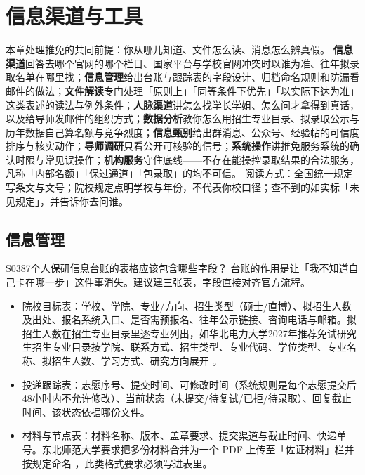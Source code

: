 \chapter{信息渠道与工具}
\label{ch21}
\begin{keybox}
本章处理推免的共同前提：你从哪儿知道、文件怎么读、消息怎么辨真假。
\textbf{信息渠道}回答去哪个官网的哪个栏目、国家平台与学校官网冲突时以谁为准、往年拟录取名单在哪里找；\textbf{信息管理}给出台账与跟踪表的字段设计、归档命名规则和防漏看邮件的做法；\textbf{文件解读}专门处理「原则上」「同等条件下优先」「以实际下达为准」这类表述的读法与例外条件；\textbf{人脉渠道}讲怎么找学长学姐、怎么问才拿得到真话，以及给导师发邮件的组织方式；\textbf{数据分析}教你怎么用招生专业目录、拟录取公示与历年数据自己算名额与竞争烈度；\textbf{信息甄别}给出群消息、公众号、经验帖的可信度排序与核实动作；\textbf{导师调研}只看公开可核验的信号；\textbf{系统操作}讲推免服务系统的确认时限与常见误操作；\textbf{机构服务}守住底线——不存在能操控录取结果的合法服务，凡称「内部名额」「保过通道」「包录取」的均不可信。
阅读方式：全国统一规定写条文与文号；院校规定点明学校与年份，不代表你校口径；查不到的如实标「未见规定」，并告诉你去问谁。
\end{keybox}

\section{信息管理}
\begin{qa}{S0387}{个人保研信息台账的表格应该包含哪些字段？}
台账的作用是让「我不知道自己卡在哪一步」这件事消失。建议建三张表，字段直接对齐官方流程。
\begin{itemize}
  \item 院校目标表：学校、学院、专业/方向、招生类型（硕士/直博）、拟招生人数及出处、报名系统入口、是否需预报名、往年公示链接、咨询电话与邮箱。拟招生人数在招生专业目录里逐专业列出，如华北电力大学2027年推荐免试研究生招生专业目录按学院、联系方式、招生类型、专业代码、学位类型、专业名称、拟招生人数、学习方式、研究方向展开 。
  \item 投递跟踪表：志愿序号、提交时间、可修改时间（系统规则是每个志愿提交后48小时内不允许修改）、当前状态（未提交/待复试/已拒/待录取）、回复截止时间、该状态依据哪份文件。
  \item 材料与节点表：材料名称、版本、盖章要求、提交渠道与截止时间、快递单号。东北师范大学要求把多份材料合并为一个 PDF 上传至「佐证材料」栏并按规定命名 ，此类格式要求必须写进表里。
\end{itemize}
\end{qa}

